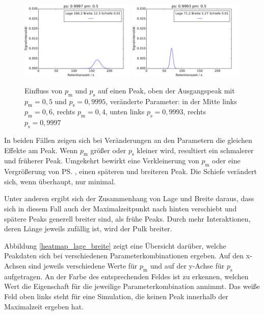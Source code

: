 \begin{figure}[h]
\includegraphics[width=0.49\textwidth]{bilder/2s_einzeleinfluss/2s_t100_psp}
\includegraphics[width=0.49\textwidth]{bilder/2s_einzeleinfluss/2s_t100_psm}
\caption[Einfluss von $p_{\text{m}}$ und $p_{\text{s}}$ auf einen Peak]{Einfluss von $p_{\text{m}}$ und $p_{\text{s}}$ auf einen Peak, oben der Ausgangspeak mit $p_{\text{m}} = 0,5$ und $p_{\text{s}} = 0,9995$, veränderte Parameter: in der Mitte links $p_{\text{m}} = 0,6$, rechts $p_{\text{m}} = 0,4$, unten links $p_{\text{s}} = 0,9993$, rechts $p_{\text{s}} = 0,9997$ }
\label{2s_t100_change}
\end{figure}

In beiden Fällen zeigen sich bei Veränderungen an den Parametern die gleichen Effekte am Peak. Wenn $p_{\text{m}}$ größer oder $p_{\text{s}}$ kleiner wird, resultiert ein schmalerer und früherer Peak. Umgekehrt bewirkt eine Verkleinerung von $p_{\text{m}}$ oder eine Vergrößerung von \ps, einen späteren und breiteren Peak. Die Schiefe verändert sich, wenn überhaupt, nur minimal.

Unter anderen ergibt sich der Zusammenhang von Lage und Breite daraus, dass sich in diesem Fall auch der Maximalzeitpunkt nach hinten verschiebt und spätere Peaks generell breiter sind, als frühe Peaks. Durch mehr Interaktionen, deren Länge jeweils zufällig ist, wird der Pulk breiter.

Abbildung \ref{heatmap_lage_breite} zeigt eine Übersicht darüber, welche Peakdaten sich bei verschiedenen Parameterkombinationen ergeben. Auf den x-Achsen sind jeweils verschiedene Werte für $p_{\text{m}}$ und auf der y-Achse für $p_{\text{s}}$ aufgetragen. An der Farbe des entsprechenden Feldes ist zu erkennen, welchen Wert die Eigenschaft für die jeweilige Parameterkombination annimmt. Das weiße Feld oben links steht für eine Simulation, die keinen Peak innerhalb der Maximalzeit ergeben hat.

